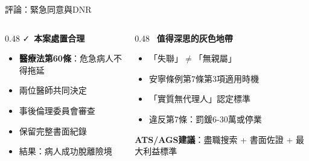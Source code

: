 \documentclass[aspectratio=169,12pt]{beamer}
\begin{document}
\begin{frame}{評論：緊急同意與DNR}

\begin{columns}[T]
\begin{column}{0.48\textwidth}
\textcolor{ethicsgreen}{\faCheck\ \textbf{本案處置合理}}
\begin{itemize}
    \item \textbf{醫療法第60條}：危急病人不得拖延
    \item 兩位醫師共同決定
    \item 事後倫理委員會審查
    \item 保留完整書面紀錄
    \item 結果：病人成功脫離險境
\end{itemize}
\end{column}

\begin{column}{0.48\textwidth}
\textcolor{warningorange}{\faExclamationTriangle\ \textbf{值得深思的灰色地帶}}
\begin{itemize}
    \item 「\alert{失聯}」$\neq$「\alert{無親屬}」
    \item 安寧條例第7條第3項適用時機
    \item 「實質無代理人」認定標準
    \item 違反第7條：罰鍰6-30萬或停業
\end{itemize}

\vspace{0.3cm}
\textcolor{ntuhblue}{\small{\textbf{ATS/AGS建議}：盡職搜索 + 書面佐證 + 最大利益標準}}
\end{column}
\end{columns}

\end{frame}
\end{document}
